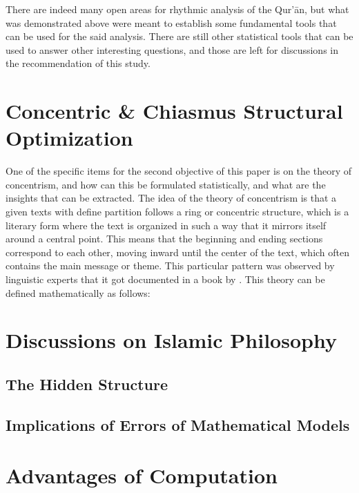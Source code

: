 There are indeed many open areas for rhythmic analysis of the Qur'\=an, but what was demonstrated above were meant to establish some fundamental tools that can be used for the said analysis. There are still other statistical tools that can be used to answer other interesting questions, and those are left for discussions in the recommendation of this study.
\section{Concentric \& Chiasmus Structural Optimization}
One of the specific items for the second objective of this paper is on the theory of concentrism, and how can this be formulated statistically, and what are the insights that can be extracted. The idea of the theory of concentrism is that a given texts with define partition follows a ring or concentric structure, which is a literary form where the text is organized in such a way that it mirrors itself around a central point. This means that the beginning and ending sections correspond to each other, moving inward until the center of the text, which often contains the main message or theme. This particular pattern was observed by linguistic experts that it got documented in a book by . This theory can be defined mathematically as follows:

\section{Discussions on Islamic Philosophy}
\subsection{The Hidden Structure}
\subsection{Implications of Errors of Mathematical Models}

\newpage

\section{Advantages of Computation}

